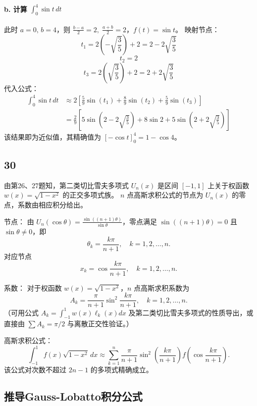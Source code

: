 \documentclass{article}
\begin{document}
\paragraph{b. 计算 \(\displaystyle\int_0^4 \sin t\,dt\)}

此时 \(a=0,\,b=4\)，则 \(\frac{b-a}{2}=2,\;\frac{a+b}{2}=2\)，\(f(t)=\sin t\)。  
映射节点：
\[
t_1 = 2\left(-\sqrt{\frac{3}{5}}\right) + 2 = 2 - 2\sqrt{\frac{3}{5}}
\]
\[
t_2 = 2
\]
\[
t_3 = 2\left(\sqrt{\frac{3}{5}}\right) + 2 = 2 + 2\sqrt{\frac{3}{5}}
\]
代入公式：
\[
\begin{aligned}
\int_0^4 \sin t\,dt &\approx 2\left[ \frac{5}{9}\sin(t_1) + \frac{8}{9}\sin(t_2) + \frac{5}{9}\sin(t_3) \right] \\
&= \frac{2}{9}\left[ 5\sin\!\left(2-2\sqrt{\frac{3}{5}}\right) + 8\sin 2 + 5\sin\!\left(2+2\sqrt{\frac{3}{5}}\right) \right]
\end{aligned}
\]
该结果即为近似值，其精确值为 \(\left[-\cos t\right]_0^4 = 1 - \cos 4\)。

\subsection*{30}

由第26、27题知，第二类切比雪夫多项式 \(U_n(x)\) 是区间 \([-1,1]\) 上关于权函数 \(w(x)=\sqrt{1-x^2}\) 的正交多项式族。  
\(n\) 点高斯求积公式的节点为 \(U_n(x)\) 的零点，系数由相应积分给出。

节点：  
由 \(U_n(\cos\theta) = \frac{\sin((n+1)\theta)}{\sin\theta}\)，零点满足 \(\sin((n+1)\theta)=0\) 且 \(\sin\theta \neq 0\)，即  
\[
\theta_k = \frac{k\pi}{n+1}, \quad k=1,2,\dots,n.
\]  
对应节点  
\[
x_k = \cos\frac{k\pi}{n+1}, \quad k=1,2,\dots,n.
\]

系数：  
对于权函数 \(w(x)=\sqrt{1-x^2}\)，\(n\) 点高斯求积系数为  
\[
A_k = \frac{\pi}{n+1}\sin^2\frac{k\pi}{n+1}, \quad k=1,2,\dots,n.
\]  
（可用公式 \(A_k = \int_{-1}^1 w(x)\ell_k(x)dx\) 及第二类切比雪夫多项式的性质导出，或直接由 \(\sum A_k = \pi/2\) 与离散正交性验证。）

高斯求积公式：  
\[
\int_{-1}^1 f(x)\sqrt{1-x^2}\,dx \approx \sum_{k=1}^n \frac{\pi}{n+1}\sin^2\!\left(\frac{k\pi}{n+1}\right) f\!\left(\cos\frac{k\pi}{n+1}\right).
\]  
该公式对次数不超过 \(2n-1\) 的多项式精确成立。

\subsection*{推导Gauss-Lobatto积分公式}
\end{document}
